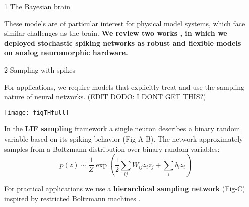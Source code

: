 \begin{frame}
\begin{columns}
\begin{column}{0.99\textwidth}
\begin{columns}[t]
\begin{column}{0.32\textwidth}
\begin{block}{\large 1 The Bayesian brain}
\begin{adjustwidth}{1cm}{1cm}
					These models are of particular interest for physical model systems, which face similar challenges as the brain.
					\textbf{We review two works \cite{dold2019stochasticity,kungl2019accelerated}, in which we deployed stochastic spiking networks as robust and flexible models on  analog neuromorphic hardware.}

					\end{adjustwidth}

					\blockSpaceOne
					\end{block}


					\interBlockSpaceOne



					\begin{block}{\large 2 Sampling with spikes}
					\blockSpaceOne

					\begin{adjustwidth}{1.cm}{1.cm}
					\justifying
					For applications, we require models that explicitly treat and use the sampling nature of neural networks. (EDIT DODO: I DONT GET THIS?)

					\vspace{.5cm}
					\begin{center}
						\texttt{[image: figTHfull]}
					\end{center}
					\vspace{.5cm}

					In the \textbf{LIF sampling} framework \cite{petrovici2016stochastic} a single neuron describes a binary random variable based on its spiking behavior (Fig-A-B).
					The network approximately samples from a Boltzmann distribution over binary random variables:
					\begin{equation}
					p(z) \sim \frac{1}{Z} \exp \left ( \frac{1}{2} \sum_{ij} W_{ij} z_i z_j + \sum_{i} b_i z_i  \right)
					\end{equation}
					\end{adjustwidth}
					For practical applications we use a \textbf{hierarchical sampling network} (Fig-C) inspired by restricted Boltzmann machines \cite{hinton1984boltzmann}.



					\blockSpaceOne
					\end{block}


				\end{column}

				\begin{column}{.01\textwidth}\end{column}


\end{columns}
\end{column}
\end{columns}
\end{frame}
